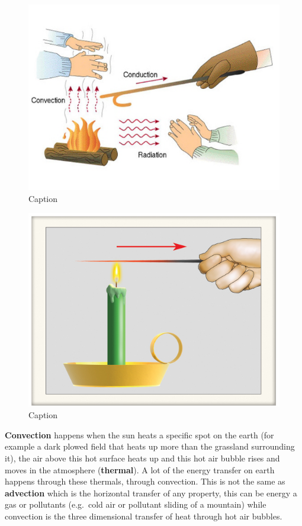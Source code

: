 \documentclass[oneside]{book}
\begin{document}
\begin{figure}

{\centering \includegraphics[width=0.5\linewidth]{figures/Figure117} 

}

\caption{Caption}\label{fig:Heattransfer}
\end{figure}

\begin{figure}

{\centering \includegraphics[width=0.5\linewidth]{figures/Figure118} 

}

\caption{Caption}\label{fig:Heattransfer2}
\end{figure}

\textbf{Convection} happens when the sun heats a specific spot on the
earth (for example a dark plowed field that heats up more than the
grassland surrounding it), the air above this hot surface heats up and
this hot air bubble rises and moves in the atmosphere
(\textbf{thermal}). A lot of the energy transfer on earth happens
through these thermals, through convection. This is not the same as
\textbf{advection} which is the horizontal transfer of any property,
this can be energy a gas or pollutants (e.g.~cold air or pollutant
sliding of a mountain) while convection is the three dimensional
transfer of heat through hot air bubbles.
\end{document}
